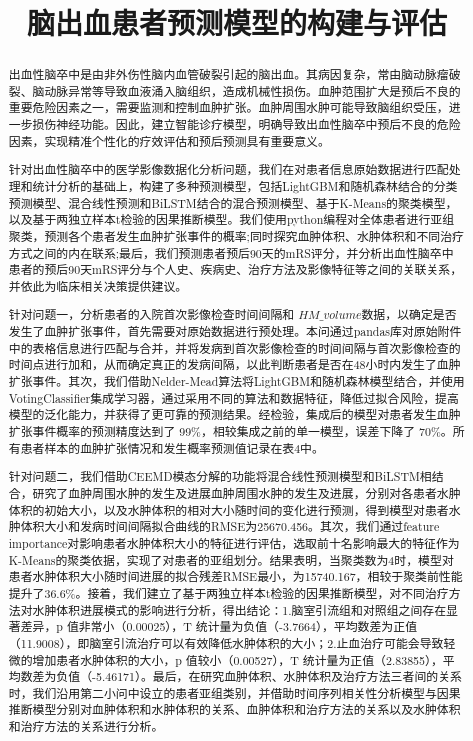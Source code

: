 \documentclass[bwprint]{gmcmthesis}
\title{脑出血患者预测模型的构建与评估}
\begin{document}
\maketitle

\begin{abstract}
出血性脑卒中是由非外伤性脑内血管破裂引起的脑出血。其病因复杂，常由脑动脉瘤破裂、脑动脉异常等导致血液涌入脑组织，造成机械性损伤。血肿范围扩大是预后不良的重要危险因素之一，需要监测和控制血肿扩张。血肿周围水肿可能导致脑组织受压，进一步损伤神经功能。因此，建立智能诊疗模型，明确导致出血性脑卒中预后不良的危险因素，实现精准个性化的疗效评估和预后预测具有重要意义。\par
针对出血性脑卒中的医学影像数据化分析问题，我们在对患者信息原始数据进行匹配处理和统计分析的基础上，构建了多种预测模型，包括LightGBM和随机森林结合的分类预测模型、混合线性预测和BiLSTM结合的混合预测模型、基于K-Means的聚类模型，以及基于两独立样本t检验的因果推断模型。我们使用python编程对全体患者进行亚组聚类，预测各个患者发生血肿扩张事件的概率;同时探究血肿体积、水肿体积和不同治疗方式之间的内在联系;最后，我们预测患者预后90天的mRS评分，并分析出血性脑卒中患者的预后90天mRS评分与个人史、疾病史、治疗方法及影像特征等之间的关联关系，并依此为临床相关决策提供建议。\par
针对问题一，分析患者的入院首次影像检查时间间隔和 $HM\_volume $数据，以确定是否发生了血肿扩张事件，首先需要对原始数据进行预处理。本问通过pandas库对原始附件中的表格信息进行匹配与合并，并将发病到首次影像检查的时间间隔与首次影像检查的时间点进行加和，从而确定真正的发病间隔，以此判断患者是否在48小时内发生了血肿扩张事件。其次，我们借助Nelder-Mead算法将LightGBM和随机森林模型结合，并使用VotingClassifier集成学习器，通过采用不同的算法和数据特征，降低过拟合风险，提高模型的泛化能力，并获得了更可靠的预测结果。经检验，集成后的模型对患者发生血肿扩张事件概率的预测精度达到了 99\%，相较集成之前的单一模型，误差下降了 70\%。所有患者样本的血肿扩张情况和发生概率预测值记录在表4中。\par
针对问题二，我们借助CEEMD模态分解的功能将混合线性预测模型和BiLSTM相结合，研究了血肿周围水肿的发生及进展血肿周围水肿的发生及进展，分别对各患者水肿体积的初始大小，以及水肿体积的相对大小随时间的变化进行预测，得到模型对患者水肿体积大小和发病时间间隔拟合曲线的RMSE为25670.456。其次，我们通过feature importance对影响患者水肿体积大小的特征进行评估，选取前十名影响最大的特征作为K-Means的聚类依据，实现了对患者的亚组划分。结果表明，当聚类数为4时，模型对患者水肿体积大小随时间进展的拟合残差RMSE最小，为15740.167，相较于聚类前性能提升了36.6\%。接着，我们建立了基于两独立样本t检验的因果推断模型，对不同治疗方法对水肿体积进展模式的影响进行分析，得出结论：1.脑室引流组和对照组之间存在显著差异，p 值非常小（0.00025），T 统计量为负值（-3.7664），平均数差为正值（11.9008），即脑室引流治疗可以有效降低水肿体积的大小；2.止血治疗可能会导致轻微的增加患者水肿体积的大小，p 值较小（0.00527），T 统计量为正值（2.83855），平均数差为负值（-5.46171）。最后，在研究血肿体积、水肿体积及治疗方法三者间的关系时，我们沿用第二小问中设立的患者亚组类别，并借助时间序列相关性分析模型与因果推断模型分别对血肿体积和水肿体积的关系、血肿体积和治疗方法的关系以及水肿体积和治疗方法的关系进行分析。\par

\end{abstract}
\end{document}
